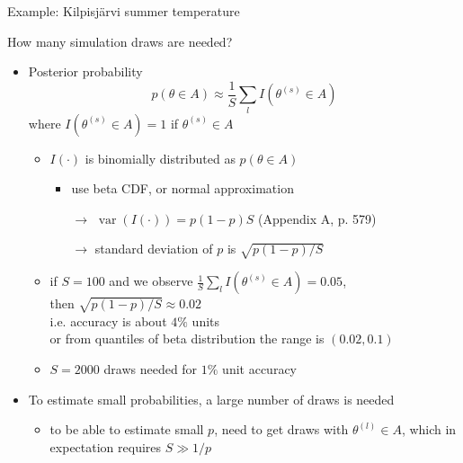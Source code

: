 \documentclass[english,t]{beamer}
\DeclareMathOperator{\var}{var}
\begin{document}
\begin{frame}{Example: Kilpisjärvi summer temperature}
{\begin{minipage}[b][12.2cm][t]{12.2cm}
    \begin{center}
      \vspace{-1.2\baselineskip}
\end{center}
  \end{minipage}
  }

\end{frame}

\begin{frame}{How many simulation draws are needed?}

  \begin{itemize}
  \item Posterior probability
    \begin{equation*}
      p(\theta \in A)\approx \frac{1}{S}\sum_l I(\theta^{(s)} \in A)
    \end{equation*}
    where $I(\theta^{(s)} \in A)=1$ if $\theta^{(s)} \in A$
    \begin{itemize}
    \item $I(\cdot)$ is binomially distributed as $p(\theta \in A)$
        \begin{itemize}
        \item use beta CDF, or normal approximation
        \item[$\rightarrow$] $\var(I(\cdot)) =  p(1-p)S$  (Appendix A, p. 579)
        \item[$\rightarrow$] standard deviation of $p$ is $\sqrt{p(1-p)/S}$
        \end{itemize}
        \pause
      \item if $S=100$ and we observe $\frac{1}{S}\sum_l I(\theta^{(s)} \in A)=0.05$,\\ then $\sqrt{p(1-p)/S} \approx 0.02$\\
        i.e. accuracy is about $4\%$ units\\
        or from quantiles of beta distribution the range is $(0.02,0.1)$
        \pause
      \item $S=2000$ draws needed for $1\%$ unit accuracy
    \end{itemize}
    \pause
  \item To  estimate small probabilities, a large number of draws is needed
    \begin{itemize}
    \item to be able to estimate small $p$, need to get draws with
      $\theta^{(l)} \in A$, which in expectation requires $S \gg 1/p$
    \end{itemize}
\end{itemize}

\end{frame}
\end{document}
